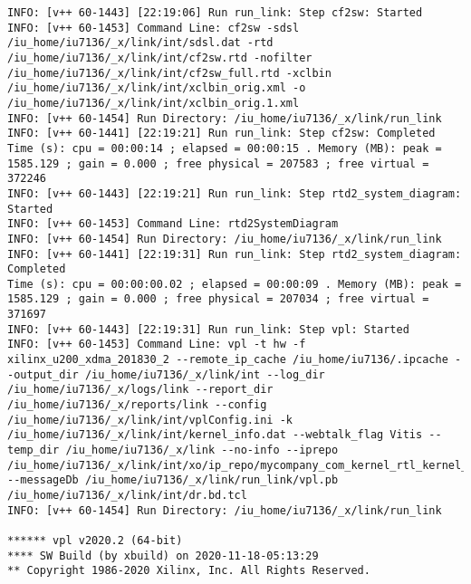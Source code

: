 \begin{lstlisting}[label=lst:code_2,caption=Содержимое файла  v++*.log]
INFO: [v++ 60-1443] [22:19:06] Run run_link: Step cf2sw: Started
INFO: [v++ 60-1453] Command Line: cf2sw -sdsl /iu_home/iu7136/_x/link/int/sdsl.dat -rtd /iu_home/iu7136/_x/link/int/cf2sw.rtd -nofilter /iu_home/iu7136/_x/link/int/cf2sw_full.rtd -xclbin /iu_home/iu7136/_x/link/int/xclbin_orig.xml -o /iu_home/iu7136/_x/link/int/xclbin_orig.1.xml
INFO: [v++ 60-1454] Run Directory: /iu_home/iu7136/_x/link/run_link
INFO: [v++ 60-1441] [22:19:21] Run run_link: Step cf2sw: Completed
Time (s): cpu = 00:00:14 ; elapsed = 00:00:15 . Memory (MB): peak = 1585.129 ; gain = 0.000 ; free physical = 207583 ; free virtual = 372246
INFO: [v++ 60-1443] [22:19:21] Run run_link: Step rtd2_system_diagram: Started
INFO: [v++ 60-1453] Command Line: rtd2SystemDiagram
INFO: [v++ 60-1454] Run Directory: /iu_home/iu7136/_x/link/run_link
INFO: [v++ 60-1441] [22:19:31] Run run_link: Step rtd2_system_diagram: Completed
Time (s): cpu = 00:00:00.02 ; elapsed = 00:00:09 . Memory (MB): peak = 1585.129 ; gain = 0.000 ; free physical = 207034 ; free virtual = 371697
INFO: [v++ 60-1443] [22:19:31] Run run_link: Step vpl: Started
INFO: [v++ 60-1453] Command Line: vpl -t hw -f xilinx_u200_xdma_201830_2 --remote_ip_cache /iu_home/iu7136/.ipcache --output_dir /iu_home/iu7136/_x/link/int --log_dir /iu_home/iu7136/_x/logs/link --report_dir /iu_home/iu7136/_x/reports/link --config /iu_home/iu7136/_x/link/int/vplConfig.ini -k /iu_home/iu7136/_x/link/int/kernel_info.dat --webtalk_flag Vitis --temp_dir /iu_home/iu7136/_x/link --no-info --iprepo /iu_home/iu7136/_x/link/int/xo/ip_repo/mycompany_com_kernel_rtl_kernel_wizard_0_1_0 --messageDb /iu_home/iu7136/_x/link/run_link/vpl.pb /iu_home/iu7136/_x/link/int/dr.bd.tcl
INFO: [v++ 60-1454] Run Directory: /iu_home/iu7136/_x/link/run_link

****** vpl v2020.2 (64-bit)
**** SW Build (by xbuild) on 2020-11-18-05:13:29
** Copyright 1986-2020 Xilinx, Inc. All Rights Reserved.


\end{lstlisting}
